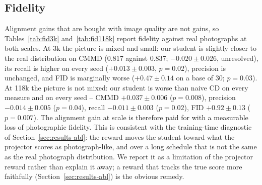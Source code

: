 \documentclass{article} %
\newcommand{\fitbox}[1]{\resizebox{\ifdim\width>\linewidth\linewidth\else\width\fi}{!}{#1}}
\newcommand{\naive}{naive CD}
\begin{document}
\subsection{Fidelity}
\label{sec:results-fid}
Alignment gains that are bought with image quality are not gains, so Tables~\ref{tab:fid3k}
and~\ref{tab:fid118k} report fidelity against real photographs at both scales. At 3k the picture is
mixed and small: our student is slightly closer to the real distribution on CMMD ($0.817$ against
$0.837$; $-0.020\pm0.026$, unresolved), its recall is higher on every seed ($+0.013\pm0.003$, $p{=}0.02$),
precision is unchanged, and FID is marginally worse ($+0.47\pm0.14$ on a base of $30$; $p{=}0.03$). At
118k the picture is not mixed: our student is worse than \naive{} on every measure and on every seed --
CMMD $+0.037\pm0.006$ ($p{=}0.008$), precision $-0.014\pm0.005$ ($p{=}0.04$), recall $-0.011\pm0.003$
($p{=}0.02$), FID $+0.92\pm0.13$ ($p{=}0.007$). The alignment gain at scale is therefore paid for with a
measurable loss of photographic fidelity. This is consistent with the training-time diagnostic of
Section~\ref{sec:results-abl}: the reward moves the student toward what the projector scores as
photograph-like, and over a long schedule that is not the same as the real photograph distribution. We
report it as a limitation of the projector reward rather than explain it away; a reward that tracks the
true score more faithfully (Section~\ref{sec:results-abl}) is the obvious remedy.

\begin{table}[t]
\centering
\caption{Fidelity on 5,000 COCO val2017 captions, 3k pool, seeds 0--2, averaged checkpoints, 4 steps,
$w{=}1$. Contrasts are seed-paired (mean $\pm$ sd, paired $t$-test $p$).}
\label{tab:fid3k}
\fitbox{}
\end{table}

\begin{table}[t]
\centering
\caption{Fidelity at 118k on the same 5,000 COCO val2017 captions, per seed (0 / 1 / 2), last-five-checkpoint
averages, 4 steps, $w{=}1$. Contrasts are seed-paired (mean $\pm$ sd, paired $t$-test $p$).}
\label{tab:fid118k}
\fitbox{}
\end{table}
\end{document}
